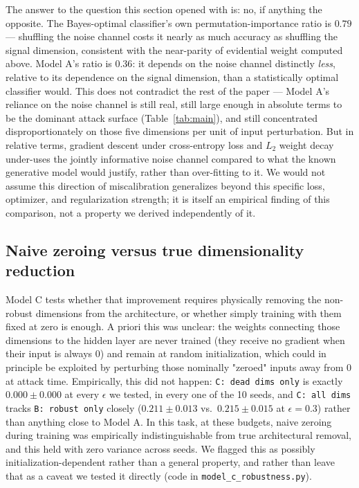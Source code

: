 \documentclass[11pt]{article}
\begin{document}
The answer to the question this section opened with is: no, if anything
the opposite. The Bayes-optimal classifier's own permutation-importance
ratio is $0.79$ --- shuffling the noise channel costs it nearly as much
accuracy as shuffling the signal dimension, consistent with the
near-parity of evidential weight computed above. Model A's ratio is
$0.36$: it depends on the noise channel distinctly \emph{less}, relative
to its dependence on the signal dimension, than a statistically optimal
classifier would. This does not contradict the rest of the paper --- Model
A's reliance on the noise channel is still real, still large enough in
absolute terms to be the dominant attack surface (Table~\ref{tab:main}),
and still concentrated disproportionately on those five dimensions per
unit of input perturbation. But in relative terms, gradient descent under
cross-entropy loss and $L_2$ weight decay under-uses the jointly
informative noise channel compared to what the known generative model
would justify, rather than over-fitting to it. We would not assume this
direction of miscalibration generalizes beyond this specific loss,
optimizer, and regularization strength; it is itself an empirical finding
of this comparison, not a property we derived independently of it.

\subsection{Naive zeroing versus true dimensionality reduction}

Model C tests whether that improvement requires physically removing the
non-robust dimensions from the architecture, or whether simply training
with them fixed at zero is enough. A priori this was unclear: the weights
connecting those dimensions to the hidden layer are never trained (they
receive no gradient when their input is always $0$) and remain at random
initialization, which could in principle be exploited by perturbing those
nominally "zeroed" inputs away from $0$ at attack time. Empirically, this
did not happen: \texttt{C: dead dims only} is exactly $0.000\pm0.000$ at
every $\epsilon$ we tested, in every one of the 10 seeds, and \texttt{C:
all dims} tracks \texttt{B: robust only} closely ($0.211\pm0.013$ vs.\
$0.215\pm0.015$ at $\epsilon=0.3$) rather than anything close to Model A.
In this task, at these budgets, naive zeroing during training was
empirically indistinguishable from true architectural removal, and this
held with zero variance across seeds. We flagged this as possibly
initialization-dependent rather than a general property, and rather than
leave that as a caveat we tested it directly (code in
\texttt{model\_c\_robustness.py}).
\end{document}
